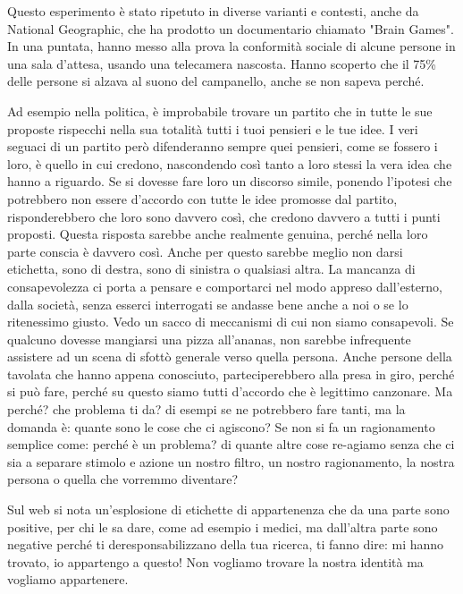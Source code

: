 \documentclass[12pt]{book} %
\begin{document}
Questo esperimento è stato ripetuto in diverse varianti e contesti, anche da National Geographic, che ha prodotto un documentario chiamato "Brain Games". In una puntata, hanno messo alla prova la conformità sociale di alcune persone in una sala d'attesa, usando una telecamera nascosta. Hanno scoperto che il 75\% delle persone si alzava al suono del campanello, anche se non sapeva perché.


\bigskip

Ad esempio nella politica, è improbabile trovare un partito che in tutte le sue proposte rispecchi nella sua totalità
tutti i tuoi pensieri e le tue idee. I veri seguaci di un partito però difenderanno sempre quei pensieri, come se
fossero i loro, è quello in cui credono, nascondendo così tanto a loro stessi la vera idea che hanno a riguardo. Se si
dovesse fare loro un discorso simile, ponendo l'ipotesi che potrebbero non essere
d'accordo con tutte le idee promosse dal partito, risponderebbero che loro sono davvero così, che
credono davvero a tutti i punti proposti. Questa risposta sarebbe anche realmente genuina, perché nella loro parte
conscia è davvero così. Anche per questo sarebbe meglio non darsi etichetta, sono di destra, sono di sinistra o
qualsiasi altra. La mancanza di consapevolezza ci porta a pensare e comportarci nel modo appreso
dall'esterno, dalla società, senza esserci interrogati se andasse bene anche a noi o se lo
ritenessimo giusto.
Vedo un sacco di meccanismi di cui non siamo consapevoli. Se qualcuno dovesse mangiarsi una pizza all'ananas, non sarebbe infrequente assistere ad un scena di sfottò generale verso quella persona. Anche persone della tavolata che hanno appena conosciuto, parteciperebbero alla presa in giro, perché si può fare, perché su questo siamo tutti d'accordo che è legittimo canzonare. Ma perché? che problema ti da? di esempi se ne potrebbero fare tanti, ma la domanda è: quante sono le cose che ci agiscono? Se non si fa un ragionamento semplice come: perché è un problema? di quante altre cose re-agiamo senza che ci sia a separare stimolo e azione un nostro filtro, un nostro ragionamento, la nostra persona o quella che vorremmo diventare?

Sul web si nota un'esplosione di etichette di appartenenza che da una parte sono positive, per chi le sa dare, come ad esempio i medici, ma dall'altra parte sono negative perché ti deresponsabilizzano della tua ricerca, ti fanno dire: mi hanno trovato, io appartengo a questo!
Non vogliamo trovare la nostra identità ma vogliamo appartenere. 
\end{document}

